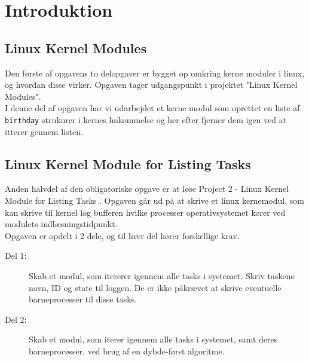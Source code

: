 \documentclass[main.tex]{subfile}
\begin{document}
\section{Introduktion}
\subsection{Linux Kernel Modules}
Den første af opgavens to delopgaver er bygget op omkring kerne moduler i linux, og hvordan disse virker. Opgaven tager udgangspunkt i projektet "Linux Kernel Modules"\cite[s.94]{SA:2013}.\\

I denne del af opgaven har vi udarbejdet et kerne modul som oprettet en liste af \texttt{birthday} strukurer i kernes hukommelse og her efter fjerner dem igen ved at itterer gennem listen.

\subsection{Linux Kernel Module for Listing Tasks}
Anden halvdel af den obligatoriske opgave er at løse Project 2 - Linux Kernel Module for Listing Tasks \cite[s.156-158]{SA:2013}. Opgaven går ud på at skrive et linux kernemodul, som kan skrive til kernel log bufferen hvilke processer operativsystemet kører ved modulets indlæsningstidpunkt.\\

Opgaven er opdelt i 2 dele, og til hver del hører forskellige krav.

\begin{description}
\item[Del 1:] Skab et modul, som itererer igennem alle tasks i systemet. Skriv taskens navn, ID og state til loggen. De er ikke påkrævet at skrive eventuelle barneprocesser til disse tasks.
\item[Del 2:] Skab et modul, som iterer igennem alle tasks i systemet, samt deres barneprocesser, ved brug af en dybde-først algoritme.
\end{description}
\end{document}
